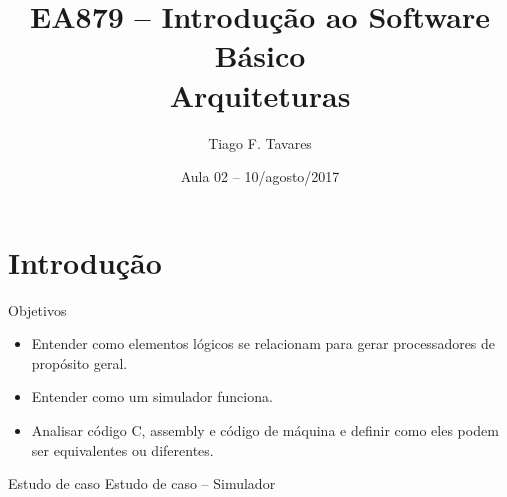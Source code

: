 \documentclass{beamer}
\title[02-Arquiteturas]{EA879 -- Introdução ao Software Básico\\Arquiteturas}
\author{Tiago F. Tavares}
\institute{FEEC -- UNICAMP}
\date{Aula 02 -- 10/agosto/2017}
\begin{document}
\begin{frame}
  \titlepage
\end{frame}


\section{Introdução}

\begin{frame}{Objetivos}
  \Large
  \begin{itemize}
    \item Entender como elementos lógicos se relacionam para gerar processadores
      de propósito geral.
    \item Entender como um simulador funciona.
    \item Analisar código C, assembly e código de máquina e definir como eles
      podem ser equivalentes ou diferentes.
  \end{itemize}
\end{frame}


\begin{frame}{Estudo de caso}
  \Large
  Estudo de caso -- Simulador

\end{frame}
\end{document}
